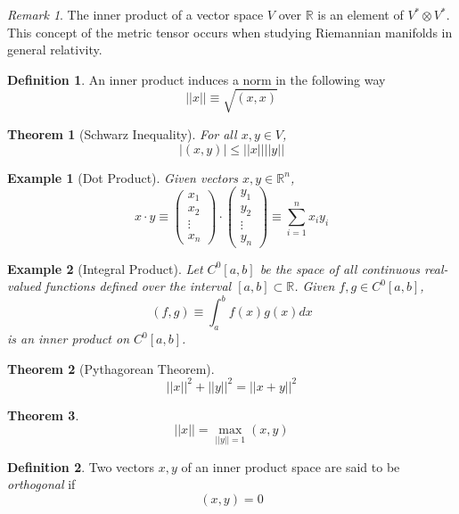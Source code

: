 \documentclass{article}
\newtheorem{theorem}{Theorem}[section]
\newtheorem{example}{Example}[section]
\theoremstyle{remark}
\newtheorem*{remark}{Remark}
\theoremstyle{definition}
\newtheorem{definition}{Definition}[section]
\begin{document}
\begin{remark}
The inner product of a vector space $V$ over $\mathbb{R}$ is an element of $V^* \otimes V^*$. This concept of the metric tensor occurs when studying Riemannian manifolds in general relativity. 
\end{remark}

\begin{definition}
An inner product induces a norm in the following way
\[||x|| \equiv \sqrt{(x,x)} \]
\end{definition}

\begin{theorem}[Schwarz Inequality]
For all $x, y \in V$, 
\[ |(x, y)| \leq ||x|| ||y||\]
\end{theorem}

\begin{example}[Dot Product]
Given vectors $x, y \in \mathbb{R}^n$, 
\[ x \cdot y \equiv  \begin{pmatrix}
x_1\\x_2\\\vdots\\x_n
\end{pmatrix} \cdot \begin{pmatrix}
y_1\\y_2\\\vdots\\y_n
\end{pmatrix} \equiv \sum_{i=1}^n x_i y_i\]
\end{example}

\begin{example}[Integral Product]
Let $C^0[a, b]$ be the space of all continuous real-valued functions defined over the interval $[a,b] \subset \mathbb{R}$. Given $f, g \in C^0[a,b]$, 
\[(f, g) \equiv \int_a^b f(x)g(x) d x\]
is an inner product on $C^0[a, b]$. 
\end{example}

\begin{theorem}[Pythagorean Theorem]
\[ ||x||^2 + ||y||^2 = ||x+y||^2\]
\end{theorem}

\begin{theorem}
\[||x|| = \max_{||y||=1} (x, y)\]
\end{theorem}

\begin{definition}
Two vectors $x, y$ of an inner product space are said to be \textit{orthogonal} if 
\[(x, y) = 0\]
\end{definition}
\end{document}
